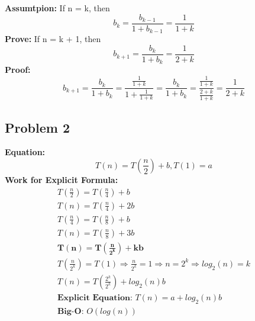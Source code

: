 \documentclass[a4paper,11pt]{article}
\begin{document}
	\textbf{Assumtpion:} If n = k, then\\
	\begin{equation*}
		b_{k}=\frac{b_{k-1}}{1+b_{k-1}}=\frac{1}{1+k}
	\end{equation*}
	\textbf{Prove:} If n = k + 1, then\\
	\begin{equation*}
		b_{k+1}=\frac{b_k}{1+b_k}=\frac{1}{2+k}
	\end{equation*}
	\textbf{Proof:}\\
	\begin{equation*}
		b_{k+1}=\frac{b_k}{1+b_k}=\frac{\frac{1}{1+k}}{1+\frac{1}{1+k}}=\frac{b_k}{1+b_k}=\frac{\frac{1}{1+k}}{\frac{2+k}{1+k}}=\frac{1}{2+k}
	\end{equation*}
	
    \subsection{Problem 2}
	\textbf{Equation:}\\
	\begin{equation*}
		T(n)=T(\frac{n}{2})+b,T(1)=a
	\end{equation*}
	\textbf{Work for Explicit Formula:}\\
	\begin{gather*}
		T(\frac{n}{2}) = T(\frac{n}{4})+b\\
		T(n)=T(\frac{n}{4})+2b\\
		T(\frac{n}{4}) = T(\frac{n}{8})+b\\
		T(n)=T(\frac{n}{8})+3b\\
		\mathbf{T(n)=T(\frac{n}{2^k})+kb}\\
		T(\frac{n}{2^k})=T(1) \Rightarrow \frac{n}{2^k}=1 \Rightarrow n = 2^k \Rightarrow log_2(n)=k\\
		T(n)=T(\frac{2^k}{2^k})+log_2(n)b\\
		\textbf{Explicit Equation: }T(n)=a+log_2(n)b\\
		\textbf{Big-O: }O(log(n))
	\end{gather*}
\end{document}
